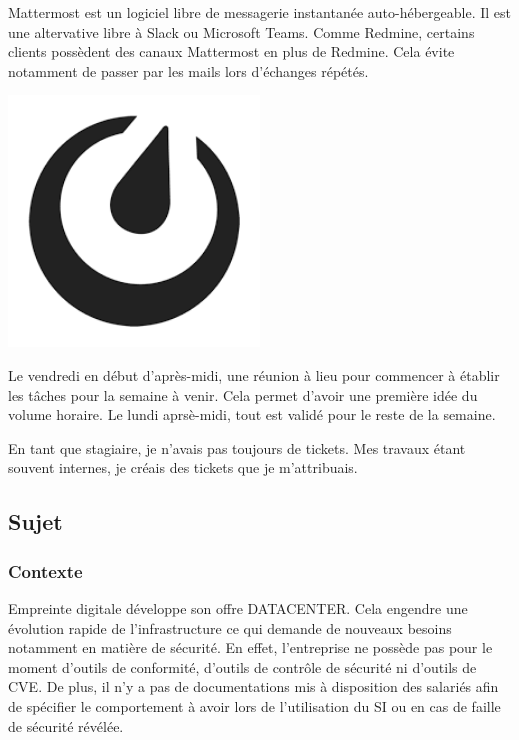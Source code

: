 \documentclass[12pt]{article}
\begin{document}
\noindent%
\begin{minipage}{.7\textwidth}%
Mattermost est un logiciel libre de messagerie instantanée auto-hébergeable.
Il est une altervative libre à Slack ou Microsoft Teams.
Comme Redmine, certains clients possèdent des canaux Mattermost en plus de Redmine.
Cela évite notamment de passer par les mails lors d'échanges répétés. \\
\end{minipage}%
\hfill
\begin{minipage}{.3\textwidth}%
\begin{center}
\includegraphics[width=0.5\textwidth]{src/logo_mattermost.png}
\end{center}
\end{minipage}%

Le vendredi en début d'après-midi, une réunion à lieu pour commencer à établir les tâches pour la semaine à venir.
Cela permet d'avoir une première idée du volume horaire.
Le lundi aprsè-midi, tout est validé pour le reste de la semaine.

En tant que stagiaire, je n'avais pas toujours de tickets.
Mes travaux étant souvent internes, je créais des tickets que je m'attribuais.

\newpage
\subsection{Sujet}
\subsubsection{Contexte}
Empreinte digitale développe son offre DATACENTER. 
Cela engendre une évolution rapide de l'infrastructure ce qui demande de nouveaux besoins notamment en matière de sécurité. 
En effet, l'entreprise ne possède pas pour le moment d'outils de conformité, d'outils de contrôle de sécurité ni d'outils de \gls{CVE}. 
De plus, il n'y a pas de documentations mis à disposition des salariés afin de spécifier le comportement à avoir lors de l'utilisation du SI ou en cas de faille de sécurité révélée.
\end{document}
